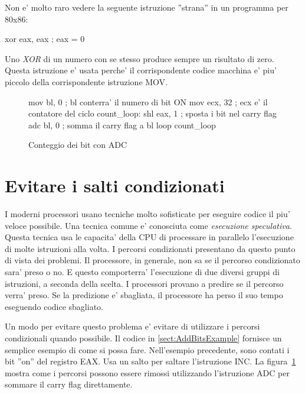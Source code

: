 Non e' molto raro vedere la seguente istruzione ''strana'' in un programma
per 80x86: 
\begin{AsmCodeListing}[frame=none,numbers=none]
      xor    eax, eax         ; eax = 0
\end{AsmCodeListing}
Uno \emph{XOR} di un numero con se stesso produce sempre un risultato di zero. 
Questa istruzione e' usata perche' il corrispondente codice macchina e'
piu' piccolo della corrispondente istruzione {\code MOV}.  

\begin{figure}[t]
\begin{AsmCodeListing}
      mov    bl, 0           ; bl conterra' il numero di bit ON
      mov    ecx, 32         ; ecx e' il contatore del ciclo
count_loop:
      shl    eax, 1          ; sposta i bit nel carry flag
      adc    bl, 0           ; somma il carry flag a bl
      loop   count_loop
\end{AsmCodeListing}
\caption{Conteggio dei bit con {\code ADC}\label{fig:countBitsAdc}}
\end{figure}

\section{Evitare i salti condizionati}

I moderni processori usano tecniche molto sofisticate per eseguire 
codice il piu' veloce possibile. Una tecnica comune e' conosciuta come
\emph{esecuzione speculativa}. Questa
tecnica usa le capacita' della CPU di processare in parallelo l'esecuzione
di molte istruzioni alla volta. I percorsi condizionati
presentano da questo punto di vista dei problemi. Il processore, in
generale, non sa se il percorso condizionato sara' preso o no. E questo 
comporterra' l'esecuzione di due diversi gruppi di istruzioni, a seconda 
della scelta. I processori provano a predire se il percorso verra' preso.
Se la predizione e' sbagliata, il processore ha perso il suo tempo
eseguendo codice sbagliato. 


Un modo per evitare questo problema e' evitare di utilizzare i percorsi
condizionali quando possibile. Il codice in \ref{sect:AddBitsExample}
fornisce un semplice esempio di come si possa fare. Nell'esempio precedente,
sono contati i bit ''on'' del registro EAX. Usa un salto per saltare 
l'istruzione {\code INC}. La figura~\ref{fig:countBitsAdc} mostra come 
i percorsi possono essere rimossi utilizzando l'istruzione {\code ADC}
per sommare il carry flag direttamente. 

